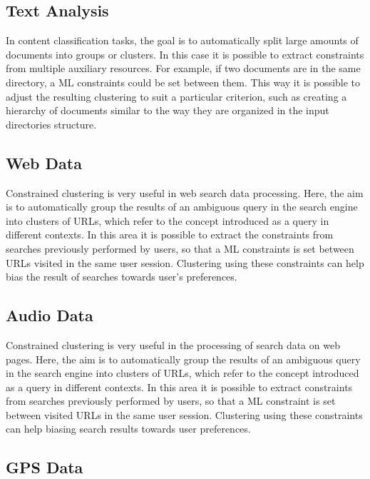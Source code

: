 \subsection{Text Analysis}

In content classification tasks, the goal is to automatically split large amounts of documents into groups or clusters. In this case it is possible to extract constraints from multiple auxiliary resources. For example, if two documents are in the same directory, a \acs{ML} constraints could be set between them. This way it is possible to adjust the resulting clustering to suit a particular criterion, such as creating a hierarchy of documents similar to the way they are organized in the input directories structure.

\subsection{Web Data} 

Constrained clustering is very useful in web search data processing. Here, the aim is to automatically group the results of an ambiguous query in the search engine into clusters of \acs{URL}s, which refer to the concept introduced as a query in different contexts. In this area it is possible to extract the constraints from searches previously performed by users, so that a \acs{ML} constraints is set between \acs{URL}s visited in the same user session. Clustering using these constraints can help bias the result of searches towards user's preferences.

\subsection{Audio Data}

Constrained clustering is very useful in the processing of search data on web pages. Here, the aim is to automatically group the results of an ambiguous query in the search engine into clusters of \acs{URL}s, which refer to the concept introduced as a query in different contexts. In this area it is possible to extract constraints from searches previously performed by users, so that a \acs{ML} constraint is set between visited \acs{URL}s in the same user session. Clustering using these constraints can help biasing search results towards user preferences.

\subsection{GPS Data} \label{sec:GPSApp}

